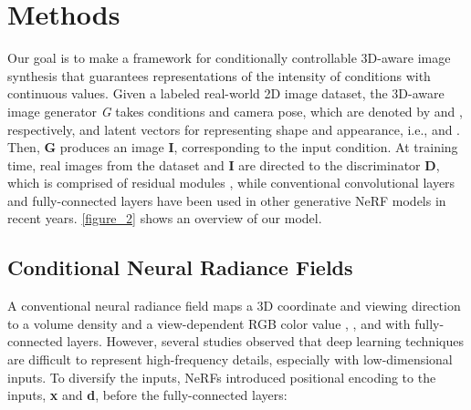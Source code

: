 \documentclass[nohyperref]{article}
\theoremstyle{plain}
\theoremstyle{definition}
\theoremstyle{remark}
\begin{document}
\begin{figure*}[t]
\begin{center}
\caption{\textbf{Overview of the proposed G-NeRF.} Since our model is inspired by the architecture of GIRAFFE, our model generates  objects and the background with  decoders and a composition operator. D\_ indicates th decoder and  represents the composition operator. The decoders take a 3D coordinate vectors of positional encoding  and viewing direction , where  indicates positional encoding functions. In addition, the decoders take conditional vectors , which are encoded by linear layers, shape codes , and appearance codes . By compositing the outputs of each decoders with the composition operator  and then volume-renders the result. Consequently, a composited feature vector  is produced. The feature vector  passes the neural rendering module . In this process, the generator  synthesizes a fake image . The discriminator  takes a real image  or the fake image  projected by the conditional labels .}
\label{figure_2}
\end{center}
\vskip -0.2in
\end{figure*}


\section{Methods}
\label{methods}
Our goal is to make a framework for conditionally controllable 3D-aware image synthesis that guarantees representations of the intensity of conditions with continuous values. Given a labeled real-world 2D image dataset, the 3D-aware image generator \textit{G} takes conditions and camera pose, which are denoted by  and , respectively, and latent vectors for representing shape and appearance, i.e.,  and . Then, \textbf{G} produces an image \textbf{I}, corresponding to the input condition. At training time, real images from the dataset and \textbf{I} are directed to the discriminator \textbf{D}, which is comprised of residual modules \cite{he2016deep}, while conventional convolutional layers \cite{o2015introduction} and fully-connected layers \cite{pinkus1999approximation} have been used in other generative NeRF models in recent years. \cref{figure_2} shows an overview of our model.


\subsection{Conditional Neural Radiance Fields} A conventional neural radiance field maps a 3D coordinate  and viewing direction  to a volume density  and a view-dependent RGB color value , , and  with fully-connected layers. However, several studies \cite{rahaman2019spectral} observed that deep learning techniques are difficult to represent high-frequency details, especially with low-dimensional inputs. To diversify the inputs, NeRFs introduced positional encoding \cite{tancik2020fourier} to the inputs, \textbf{x} and \textbf{d}, before the fully-connected layers:
\end{document}

